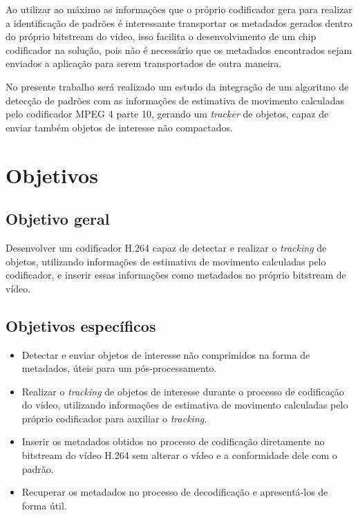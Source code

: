 Ao utilizar ao máximo as informações que o próprio codificador gera para realizar a identificação de padrões é interessante transportar os metadados gerados dentro do próprio bitstream do vídeo, isso facilita o desenvolvimento de um chip codificador na solução, pois não é necessário que os metadados encontrados sejam enviados a aplicação para serem transportados de outra maneira.

No presente trabalho será realizado um estudo da integração de um algoritmo de detecção de padrões com as informações de estimativa de movimento calculadas pelo codificador MPEG 4 parte 10, gerando um \textit{tracker} de objetos, capaz de enviar também objetos de interesse não compactados.

\section{Objetivos}

\subsection{Objetivo geral}

Desenvolver um codificador H.264 capaz de detectar e realizar o \textit{tracking} de objetos, utilizando informações de estimativa de movimento calculadas pelo codificador, e inserir essas informações como metadados no próprio bitstream de vídeo.

\subsection{Objetivos específicos}

\begin{itemize}
        \item Detectar e enviar objetos de interesse não comprimidos na forma de metadados, úteis para um pós-processamento. 
	\item Realizar o \textit{tracking} de objetos de interesse durante o processo de codificação do vídeo, utilizando informações de estimativa de movimento calculadas pelo próprio codificador para auxiliar o \textit{tracking}.
	\item Inserir os metadados obtidos no processo de codificação diretamente no bitstream do vídeo H.264 sem alterar o vídeo e a conformidade dele com o padrão. 
	\item Recuperar os metadados no processo de decodificação e apresentá-los de forma útil.
\end{itemize}



